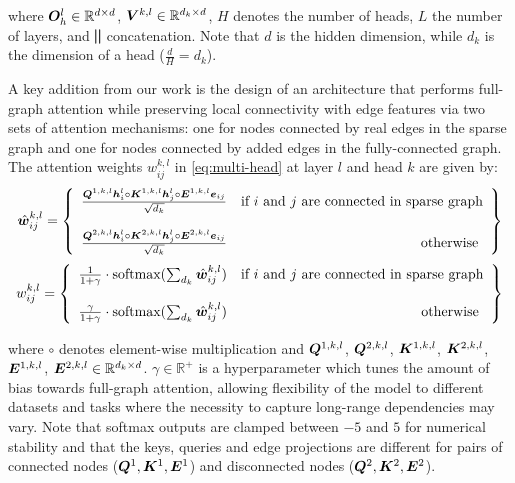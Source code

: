 \documentclass{article}
\begin{document}
where ${\bm{O}}^l_h \in \mathbb{R}^{d \times d}$, ${\bm{V}}^{k,l} \in \mathbb{R}^{d_k \times d}$, $H$ denotes the number of heads, $L$ the number of layers, and $\bigparallel$ concatenation. Note that $d$ is the hidden dimension, while $d_k$ is the dimension of a head ($\frac{d}{H}=d_k$).

A key addition from our work is the design of an architecture that performs full-graph attention while preserving local connectivity with edge features via two sets of attention mechanisms: one for nodes connected by real edges in the sparse graph and one for nodes connected by added edges in the fully-connected graph. The attention weights $w_{ij}^{k,l}$ in \eqref{eq:multi-head} at layer $l$ and head $k$ are given by:
\begin{equation}
        \label{eq:attention}
        \hat{{\bm{w}}}_{ij}^{k,l} = \left\{\begin{array}{lr}
        \frac{{\bm{Q}}^{1,k,l}{\bm{h}}_i^l \circ {\bm{K}}^{1,k,l} {\bm{h}}_j^l\circ {\bm{E}}^{1,k,l}{\bm{e}}_{ij}}{\sqrt{d_k}} & \text{if $i$ and $j$ are connected in sparse graph}\\
        \\
        \frac{{\bm{Q}}^{2,k,l}{\bm{h}}_i^l \circ {\bm{K}}^{2,k,l}{\bm{h}}_j^l\circ {\bm{E}}^{2,k,l}{\bm{e}}_{ij}}{\sqrt{d_k}} & \text{otherwise }\\
        \end{array}\right\}
\end{equation}
%
%
\begin{equation}
    \label{eq:gamma}
    {w}_{ij}^{k,l} = \left\{\begin{array}{lr}
        \frac{1}{1+\gamma}\cdot\text{softmax}(\sum_{d_k}\hat{{\bm{w}}}_{ij}^{k,l}) & \text{if $i$ and $j$ are connected in sparse graph}\\
        \\
        \frac{\gamma}{1+\gamma}\cdot\text{softmax}(\sum_{d_k}\hat{{\bm{w}}}_{ij}^{k,l})& \text{otherwise }\\
        \end{array}\right\}
\end{equation}


where $\circ$ denotes element-wise multiplication and ${\bm{Q}}^{1,k,l}$, ${\bm{Q}}^{2,k,l}$, ${\bm{K}}^{1,k,l}$, ${\bm{K}}^{2,k,l}$, ${\bm{E}}^{1,k,l}$, ${\bm{E}}^{2,k,l}\in \mathbb{R}^{d_k \times d}$. $\gamma \in \mathbb{R^+}$ is a hyperparameter which tunes the amount of bias towards full-graph attention, allowing flexibility of the model to different datasets and tasks where the necessity to capture long-range dependencies may vary. Note that softmax outputs are clamped between $-5$ and $5$ for numerical stability and that the keys, queries and edge projections are different for pairs of connected nodes (${\bm{Q}}^1, {\bm{K}}^1, {\bm{E}}^1$) and disconnected nodes (${\bm{Q}}^2, {\bm{K}}^2, {\bm{E}}^2$).
\end{document}
